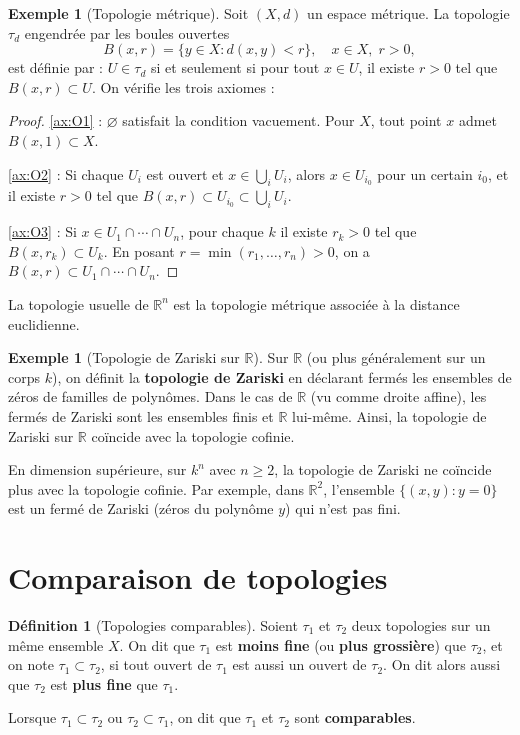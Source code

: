 \documentclass[12pt,a4paper,openany]{book}
\theoremstyle{definition}
\newtheorem{definition}{Définition}[chapter]
\theoremstyle{cours}
\theoremstyle{coursnormal}
\newtheorem{exemple}[theoreme]{Exemple}
\newcommand{\R}{\mathbb{R}}
\begin{document}
\begin{exemple}[Topologie métrique]\label{ex:topo-metrique}
  Soit $(X,d)$ un espace métrique. La topologie $\tau_d$ engendrée par les boules ouvertes
  \[
    B(x,r) = \{y \in X : d(x,y) < r\}, \quad x \in X,\; r > 0,
  \]
  est définie par : $U \in \tau_d$ si et seulement si pour tout $x \in U$, il existe $r > 0$ tel que $B(x,r) \subset U$. On vérifie les trois axiomes :
  \begin{proof}
    \ref{ax:O1} : $\varnothing$ satisfait la condition vacuement. Pour $X$, tout point $x$ admet $B(x,1) \subset X$.

    \ref{ax:O2} : Si chaque $U_i$ est ouvert et $x \in \bigcup_i U_i$, alors $x \in U_{i_0}$ pour un certain $i_0$, et il existe $r > 0$ tel que $B(x,r) \subset U_{i_0} \subset \bigcup_i U_i$.

    \ref{ax:O3} : Si $x \in U_1 \cap \cdots \cap U_n$, pour chaque $k$ il existe $r_k > 0$ tel que $B(x,r_k) \subset U_k$. En posant $r = \min(r_1,\ldots,r_n) > 0$, on a $B(x,r) \subset U_1 \cap \cdots \cap U_n$.
  \end{proof}
  La topologie usuelle de $\R^n$ est la topologie métrique associée à la distance euclidienne.
\end{exemple}

\begin{exemple}[Topologie de Zariski sur $\R$]\label{ex:topo-zariski}
  Sur $\R$ (ou plus généralement sur un corps $k$), on définit la \textbf{topologie de Zariski} en déclarant fermés les ensembles de zéros de familles de polynômes. Dans le cas de $\R$ (vu comme droite affine), les fermés de Zariski sont les ensembles finis et $\R$ lui-même. Ainsi, la topologie de Zariski sur $\R$ coïncide avec la topologie cofinie.

  En dimension supérieure, sur $k^n$ avec $n \geq 2$, la topologie de Zariski ne coïncide plus avec la topologie cofinie. Par exemple, dans $\R^2$, l'ensemble $\{(x,y) : y = 0\}$ est un fermé de Zariski (zéros du polynôme $y$) qui n'est pas fini.
\end{exemple}

\section{Comparaison de topologies}
\label{sec:comparaison-topologies}

\begin{definition}[Topologies comparables]\label{def:topo-comparables}
  Soient $\tau_1$ et $\tau_2$ deux topologies sur un même ensemble $X$. On dit que $\tau_1$ est \textbf{moins fine} (ou \textbf{plus grossière}) que $\tau_2$, et on note $\tau_1 \subset \tau_2$, si tout ouvert de $\tau_1$ est aussi un ouvert de $\tau_2$. On dit alors aussi que $\tau_2$ est \textbf{plus fine} que $\tau_1$.

  Lorsque $\tau_1 \subset \tau_2$ ou $\tau_2 \subset \tau_1$, on dit que $\tau_1$ et $\tau_2$ sont \textbf{comparables}.
\end{definition}
\end{document}
